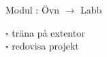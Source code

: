 
    Modul : Övn  $\rightarrow$ Labb 
    \begin{multicols}{3}\SlideFontTiny
    $\square$ träna på extentor \\
$\square$ redovisa projekt \\
    \end{multicols}
    